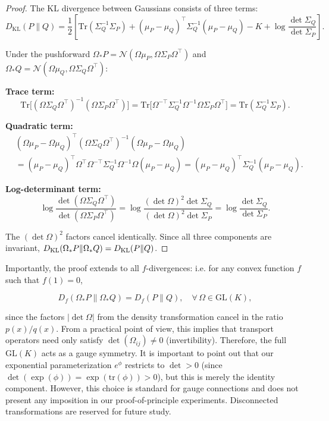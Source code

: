 \documentclass[twoside,11pt]{article}
\begin{document}
\begin{proof}
The KL divergence between Gaussians consists of three terms:
\begin{equation}
D_{\mathrm{KL}}(P \| Q) = \frac{1}{2}\left[\mathrm{Tr}(\Sigma_Q^{-1}\Sigma_P) + (\mu_P - \mu_Q)^\top \Sigma_Q^{-1}(\mu_P - \mu_Q) - K + \log\frac{\det\Sigma_Q}{\det\Sigma_P}\right].
\end{equation}

Under the pushforward $\Omega_* P = \mathcal{N}(\Omega\mu_P, \Omega\Sigma_P\Omega^\top)$ and $\Omega_* Q = \mathcal{N}(\Omega\mu_Q, \Omega\Sigma_Q\Omega^\top)$:

\textbf{Trace term:}
\begin{equation}
\mathrm{Tr}\big[(\Omega\Sigma_Q\Omega^\top)^{-1}(\Omega\Sigma_P\Omega^\top)\big] = \mathrm{Tr}\big[\Omega^{-\top}\Sigma_Q^{-1}\Omega^{-1}\Omega\Sigma_P\Omega^\top\big] = \mathrm{Tr}(\Sigma_Q^{-1}\Sigma_P). 
\end{equation}

\textbf{Quadratic term:}
\begin{align}
&(\Omega\mu_P - \Omega\mu_Q)^\top (\Omega\Sigma_Q\Omega^\top)^{-1} (\Omega\mu_P - \Omega\mu_Q) \nonumber\\
&= (\mu_P - \mu_Q)^\top \Omega^\top \Omega^{-\top}\Sigma_Q^{-1}\Omega^{-1}\Omega (\mu_P - \mu_Q) = (\mu_P - \mu_Q)^\top \Sigma_Q^{-1}(\mu_P - \mu_Q). 
\end{align}

\textbf{Log-determinant term:}
\begin{equation}
\log\frac{\det(\Omega\Sigma_Q\Omega^\top)}{\det(\Omega\Sigma_P\Omega^\top)} = \log\frac{(\det\Omega)^2 \det\Sigma_Q}{(\det\Omega)^2 \det\Sigma_P} = \log\frac{\det\Sigma_Q}{\det\Sigma_P}. 
\end{equation}

The $(\det\Omega)^2$ factors cancel identically. Since all three components are invariant, $\\ D_{\mathrm{KL}}(\Omega_* P \| \Omega_* Q) = D_{\mathrm{KL}}(P \| Q)$.
\end{proof}

Importantly, the proof extends to all $f$-divergences: i.e. for any convex function $f$ such that $f(1) = 0$,

\begin{equation}
D_f(\Omega_* P \| \Omega_* Q) = D_f(P \| Q), \quad \forall\, \Omega \in \mathrm{GL}(K),
\end{equation}

since the factors $|\det\Omega|$ from the density transformation cancel in the ratio $p(x)/q(x)$. From a practical point of view, this implies that transport operators need only satisfy $\det(\Omega_{ij}) \neq 0$ (invertibility).  Therefore, the full $\mathrm{GL}(K)$ acts as a gauge symmetry. It is important to point out that our exponential parameterization $e^{\phi}$ restricts to $\det > 0$ (since $\det(\exp(\phi)) = \exp(\mathrm{tr}(\phi)) > 0$), but this is merely the identity component.  However, this choice is standard for gauge connections and does not present any imposition in our proof-of-principle experiments. Disconnected transformations are reserved for future study.  
\end{document}
